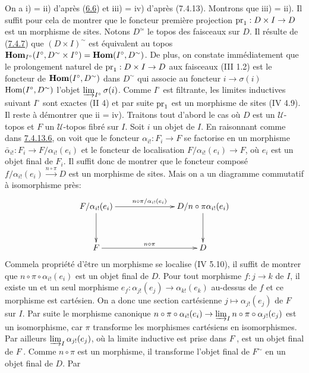 \documentclass[10pt]{../fichiers-configuration-latex/smfart}
\begin{document}
On a i) = ii) d'après (\hyperref[VI.exe6.6]{6.6}) et iii) = iv) d'après (7.4.13). Montrons
que iii) = ii). Il suffit pour cela de montrer que le foncteur
première projection $\pr_1 : D \times I \to D$ est un morphisme de
sites. Notons $D^{\simeq}$ le topos des faisceaux sur $D$. Il
résulte de (\hyperref[VI.prop7.4.7]{7.4.7}) que $(D \times I)^{\sim}$ est équivalent au topos
$\operatorname{\mathbf{Hom}}_{I^{\circ}} (I^{\circ}, D^{\sim} \times I^{\circ}) = \operatorname{\mathbf{Hom}}(I^{\circ}, D^{\sim})$. De plus, on
constate immédiatement que le prolongement naturel de $\pr_1 : D
\times I \to D$ aux faisceaux (III 1.2) est le foncteur de $\operatorname{\mathbf{Hom}}(I^{\circ},
D^{\sim})$ dans $D^{\sim}$ qui associe au foncteur $i \to \sigma(i)$
$\operatorname{Hom}(I^{\circ}, D^{\sim})$ l'objet
$\varinjlim_{I^{\circ}}\sigma(i)$. Comme $I^{\circ}$ est
filtrante, les limites inductives suivant $I^{\circ}$ sont exactes (II 4) et
par suite $\operatorname{pr}_1$ est un morphisme de sites (IV 4.9). Il reste à
démontrer que ii = iv). Traitons tout d'abord le cas où $D$ est un
$𝒰$-topos et $F$ un $𝒰$-topos fibré sur $I$.
Soit $i$ un objet de $I$. En raisonnant comme dans \hyperref[VI.par7.4.13.6]{7.4.13.6}, on voit que le foncteur
$\alpha_{i!} : F_i \to F$ se factorise en un morphisme
$\bar{\alpha}_{i!} : F_i \to F/\alpha_{i!} (e_i)$ et le foncteur de
localisation $F/\alpha_{i!}(e_i) \to F$, où $e_i$ est un objet final
de $F_i$. Il suffit donc de montrer que le foncteur composé
$f/\alpha_{i!} (e_i) \xrightarrow{n \circ \pi} D$ est un morphisme de
sites. Mais on a un diagramme commutatif à isomorphisme près:
\[
\xymatrix@C=2.5cm@R=1.25cm{
F/\alpha_{i!}(e_i) \ar[d]\ar[r]^{n\circ
  \pi/\alpha_{i!}(e_i)}& D/n\circ \pi \alpha_{i!}(e_i) \ar[d]\\
F \ar[r]^{n\circ \pi}& D
}
\]
Comme\pageoriginale la propriété d'être un morphisme se localise (IV 5.10), il
suffit de montrer que $n \circ \pi\circ \alpha_{i!}(e_{i})$ est un objet
final de $D$. Pour tout morphisme $f : j \to k$ de $I$, il existe un
et un seul morphisme $e_f : \alpha_{j!}(e_j) \to \alpha_{k!}(e_k)$
au-dessus de $f$ et ce morphisme est cartésien. On a donc une section
cartésienne $j \mapsto \alpha_{j!}(e_j)$ de $F$ sur $I$. Par suite le
morphisme canonique $n \circ \pi \circ \alpha_{i!} (e_{i}) \to \varinjlim_{I} n
\circ \pi \circ \alpha_{j!}(e_j)$
est un isomorphisme, car $\pi$ transforme les morphismes cartésiens en
isomorphismes. Par ailleurs $\varinjlim_I
\alpha_{j!}(e_j)$, où la limite inductive est prise dans
$F^{\widehat{\phantom{,}}}$, est un objet final de
$F^{\widehat{\phantom{,}}}$. Comme $n \circ \pi$ est un morphisme, il
transforme l'objet final de $F^{\sim}$ en un objet final de $D$. Par
\end{document}
